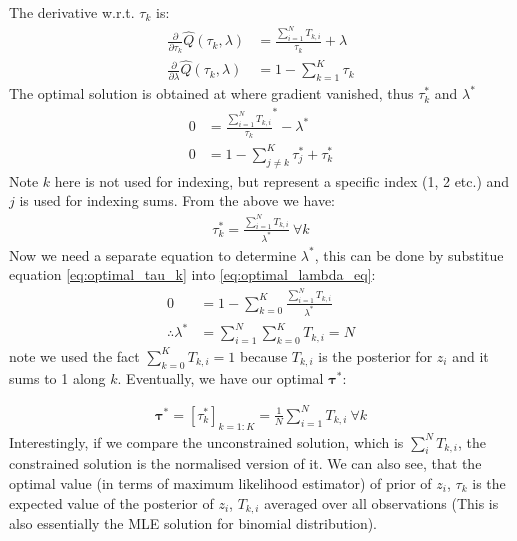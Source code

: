 \documentclass{article} [10pt] %
\newcommand{\bs}{\boldsymbol}
\begin{document}
The derivative w.r.t. $\tau_k$ is:
\begin{align}
	\frac{\partial }{\partial \tau_k} \hat Q(\tau_k, \lambda) &= \frac{\sum_{i=1}^N T_{k, i}}{\tau_k} + \lambda\\
	\frac{\partial }{\partial \lambda} \hat Q(\tau_k, \lambda) &= 1-\sum_{k=1}^K \tau_k
\end{align}
The optimal solution is obtained at where gradient vanished, thus $\tau_k^*$ and $\lambda^*$
\begin{align}
	0&= \frac{\sum_{i=1}^N T_{k, i}}{\tau_k}^* - \lambda^*\\
	0&= 1-\sum_{j\neq k}^K \tau_j^* + \tau_k^* \label{eq:optimal_lambda_eq}
\end{align}
Note $k$ here is not used for indexing, but represent a specific index (1, 2 etc.) and $j$ is used for indexing sums. From the above we have:
\begin{align}
	\tau_k^* = \frac{\sum_{i=1}^N T_{k, i}}{\lambda^*} \ \forall k \label{eq:optimal_tau_k}
\end{align}
Now we need a separate equation to determine $\lambda^*$, this can be done by substitue equation \eqref{eq:optimal_tau_k} into \eqref{eq:optimal_lambda_eq}:
\begin{align}
	0&= 1-\sum_{k=0}^K  \frac{\sum_{i=1}^N T_{k, i}}{\lambda^*} \\
	\therefore \lambda^* &= \sum_{i=1}^N  \sum_{k=0}^K  T_{k, i} = N
\end{align}
note we used the fact $ \sum_{k=0}^K  T_{k, i} =1$ because $T_{k, i}$ is the posterior for $z_i$ and it sums to 1 along $k$.
Eventually, we have our optimal $\bs\tau^*$:

\begin{align} \label{eq:optimal_tau}
\boxed{
	\bs\tau^* = [\tau_k^*]_{k=1:K} = \frac{1}{N}\sum_{i=1}^N T_{k, i} \ \forall k
}
\end{align}
Interestingly, if we compare the unconstrained solution, which is $\sum_i^NT_{k,i}$, the constrained solution is the normalised version of it. We can also see, that the optimal value (in terms of maximum likelihood estimator) of prior of $z_i$, $\tau_k$ is the expected value of the posterior of $z_i$, $T_{k, i}$ averaged over all observations (This is also essentially the MLE solution for binomial distribution).
\end{document}
